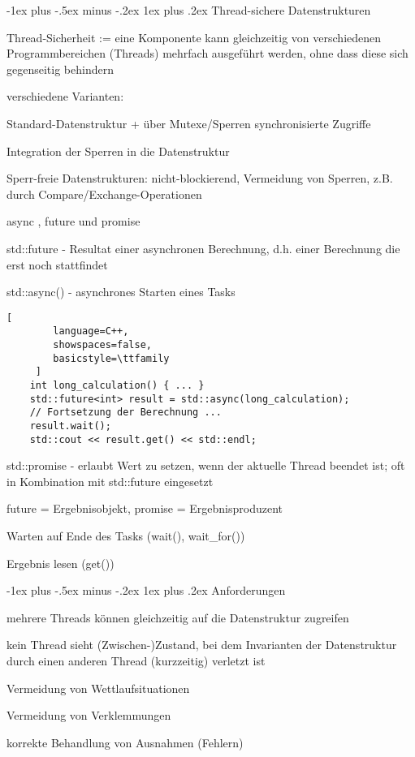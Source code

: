 \documentclass[10pt]{article}
\makeatletter
\renewcommand{\subsubsection}{\@startsection{subsubsection}{3}{0mm}%
                                {-1ex plus -.5ex minus -.2ex}%
                                {1ex plus .2ex}%
                                {\normalfont\small\bfseries}}
\makeatother
\begin{document}
\subsubsection{Thread-sichere Datenstrukturen}
\begin{itemize*}
  \item Thread-Sicherheit := eine Komponente kann gleichzeitig von verschiedenen Programmbereichen (Threads) mehrfach ausgeführt werden, ohne dass diese sich gegenseitig behindern
  \item verschiedene Varianten:
  \begin{itemize*}
    \item Standard-Datenstruktur + über Mutexe/Sperren synchronisierte Zugriffe
    \item Integration der Sperren in die Datenstruktur
    \item Sperr-freie Datenstrukturen: nicht-blockierend, Vermeidung von Sperren, z.B. durch Compare/Exchange-Operationen
  \end{itemize*}
  \item async , future und promise
  \item std::future - Resultat einer asynchronen Berechnung, d.h. einer Berechnung die erst noch stattfindet
  \item std::async() - asynchrones Starten eines Tasks
  \begin{lstlisting}[
        language=C++,
        showspaces=false,
        basicstyle=\ttfamily
     ]
    int long_calculation() { ... }
    std::future<int> result = std::async(long_calculation);
    // Fortsetzung der Berechnung ...
    result.wait();
    std::cout << result.get() << std::endl;
    \end{lstlisting}
  \item std::promise - erlaubt Wert zu setzen, wenn der aktuelle Thread beendet ist; oft in Kombination mit std::future eingesetzt
  \item future = Ergebnisobjekt, promise = Ergebnisproduzent
  \begin{itemize*}
    \item Warten auf Ende des Tasks (wait(), wait\_for())
    \item Ergebnis lesen (get())
  \end{itemize*}
\end{itemize*}


\subsubsection{Anforderungen}
\begin{itemize*}
  \item mehrere Threads können gleichzeitig auf die Datenstruktur zugreifen
  \item kein Thread sieht (Zwischen-)Zustand, bei dem Invarianten der Datenstruktur durch einen anderen Thread (kurzzeitig) verletzt ist
  \item Vermeidung von Wettlaufsituationen
  \item Vermeidung von Verklemmungen
  \item korrekte Behandlung von Ausnahmen (Fehlern)
\end{itemize*}
\end{document}
